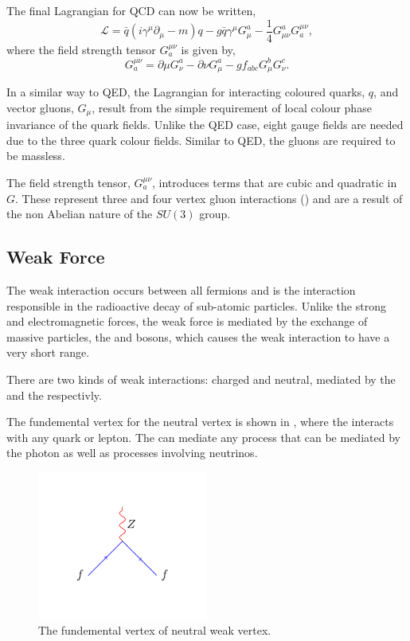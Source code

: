 The final Lagrangian for QCD can now be written,
\begin{equation}
\mathcal{L} = 
\bar{q}(i\gamma^{\mu}\partial_{\mu} - m)q -
g \bar{q} \gamma^{\mu} G_{\mu}^{a} - 
\frac{1}{4} G_{\mu\nu}^{a} G^{\mu\nu}_{a},
\end{equation}
where the field strength tensor $G^{\mu\nu}_{a}$ is given by,
\begin{equation}
G^{\mu\nu}_{a} 
= \partial{\mu} G^{a}_{\nu}
- \partial{\nu} G^{a}_{\mu}
-g f_{abc} G^{b}_{\mu} G^{c}_{\nu}.
\end{equation}

In a similar way to QED, the Lagrangian for interacting coloured quarks, $q$, and
vector gluons, $G_{\mu}$, result from the simple requirement of local colour
phase invariance of the quark fields. Unlike the QED case, eight gauge fields
are needed due to the three quark colour fields.  Similar to QED, the gluons are
required to  be massless.

The field strength tensor, $G^{\mu\nu}_{a}$, introduces terms that are cubic and
quadratic in $G$. These represent three and four vertex gluon interactions
() and are a result of the non Abelian nature of the
$SU(3)$ group.

\subsection{Weak Force}
The weak interaction occurs between all fermions and is the interaction
responsible in the radioactive decay of sub-atomic particles.  Unlike the strong
and electromagnetic forces, the weak force is mediated by the exchange of
massive particles, the \PWpm and \PZ bosons, which causes the weak interaction
to have a very short range.

There are two kinds of weak interactions: charged and neutral, mediated by the
\PW and the \PZ respectivly.

The fundemental vertex for the neutral vertex is shown in
, where the \PZ interacts with any quark or lepton.
The \PZ can mediate any process that can be mediated by the photon as well as
processes involving neutrinos.
\begin{figure}[htbp]
  \centering
  \includegraphics[width=0.5\textwidth]{weak_neut_process}
  \caption{The fundemental vertex of neutral weak vertex.}
  \label{fig:neutral}
\end{figure}

